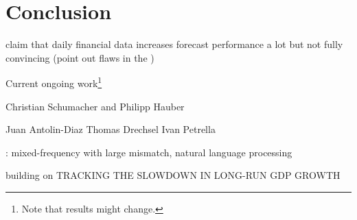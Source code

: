 \chapter{Conclusion}


\citet{AndreouEtal2013} claim that daily financial data increases forecast performance a lot but not fully convincing (point out flaws in the )



Current ongoing work\footnote{Note that results might change.}

Christian Schumacher and Philipp Hauber

Juan Antolin-Diaz Thomas Drechsel Ivan Petrella

\citet{Thorsrud2016a,Thorsrud2016b}: mixed-frequency with large mismatch, natural language processing

building on TRACKING THE SLOWDOWN IN LONG-RUN GDP GROWTH
